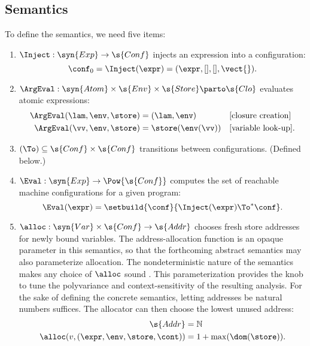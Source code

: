\subsection{Semantics}

To define the semantics, we need five items:
\begin{enumerate}
\item $\Inject : \syn{Exp} \to \s{Conf}$ injects an expression into
a configuration:
\begin{equation*}
\conf_0 = \Inject(\expr) = (\expr, [], [], \vect{})
\text.
\end{equation*}



\item{$\ArgEval : \syn{Atom} \times \s{Env} \times \s{Store} \parto
\s{Clo}$ evaluates atomic expressions:
\begin{align*}
  \ArgEval(\lam,\env,\store) &= (\lam,\env) && \text{[closure creation]}
  \\
  \ArgEval(\vv,\env,\store) &= \store(\env(\vv)) && \text{[variable look-up]}
  \text.
\end{align*}}

\item{$(\To) \subseteq \s{Conf} \times \s{Conf}$ transitions between
configurations. (Defined below.)}

\item{$\Eval : \syn{Exp} \to \Pow{\s{Conf}}$ computes the set of
 reachable machine configurations for a given program:
 \begin{equation*}
   \Eval(\expr) = \setbuild{ \conf }{ \Inject(\expr) \To^* \conf } 
   \text.
 \end{equation*}}

\item{$\alloc : \syn{Var} \times \s{Conf} \to \s{Addr}$ 
chooses fresh store addresses for newly bound variables.
The address-allocation function is an opaque parameter in this semantics,
so that the forthcoming abstract semantics may also parameterize allocation. 
The nondeterministic nature of the semantics makes any choice of $\alloc$ sound \citep{mattmight:Might:2009:APosteriori}.
This parameterization provides the knob to tune the polyvariance and context-sensitivity of the resulting analysis.
For the sake of defining the concrete semantics, letting addresses be natural numbers suffices.
The allocator can then choose the lowest unused address:
\begin{align*}
  \s{Addr} &= \mathbb{N}
  \\
  \alloc(v,(\expr,\env,\store,\cont)) &= 
  1 + \max(\dom(\store))
  \text.
\end{align*}}
\end{enumerate}









